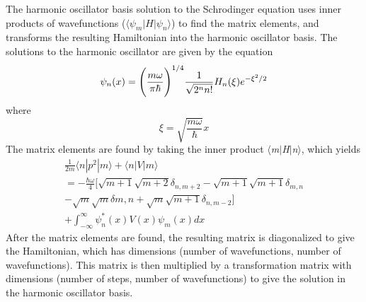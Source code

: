 \documentclass[%
 reprint,
 amsmath,amssymb,
 aps,
]{revtex4-1}
\begin{document}
\noindent The harmonic oscillator basis solution to the Schrodinger equation uses inner products of wavefunctions ($\langle\psi_m|H|\psi_n\rangle$) to find the matrix elements, and transforms the resulting Hamiltonian into the harmonic oscillator basis.  The solutions to the harmonic oscillator are given by the equation
\begin{equation}
\psi_n(x)=\Bigg{(}\frac{m\omega}{\pi\hbar}\Bigg{)}^{1/4}\frac{1}{\sqrt{2^n n!}}H_n(\xi)e^{-\xi^2/2}
\end{equation}
\noindent where
\begin{equation}
\xi=\sqrt{\frac{m\omega}{\hbar}}x
\end{equation}
The matrix elements are found by taking the inner product $\langle$\textit{m}$|$\textit{H}$|$\textit{n}$\rangle$, which yields
\begin{multline}
\frac{1}{2m}\langle n|p^2|m \rangle + \langle n|V|m \rangle \\
=-\frac{\hbar\omega}{4}[\sqrt{m+1}\sqrt{m+2}\delta_{n,m+2}-\sqrt{m+1}\sqrt{m+1}\delta_{m,n}\\
-\sqrt{m}\sqrt{m}\delta{m,n}+\sqrt{m}\sqrt{m+1}\delta_{n,m-2}] \\
+ \int_{-\infty}^{\infty}\psi_n^*(x)V(x)\psi_m(x)dx
\end{multline}
After the matrix elements are found, the resulting matrix is diagonalized to give the Hamiltonian, which has dimensions (number of wavefunctions, number of wavefunctions).  This matrix is then multiplied by a transformation matrix with dimensions (number of steps, number of wavefunctions) to give the solution in the harmonic oscillator basis.\\
\end{document}
